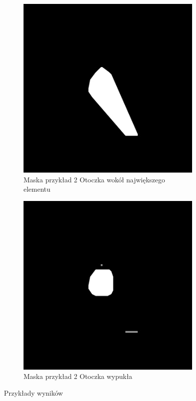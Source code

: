 \documentclass[a4paper,11pt,twoside]{report}
\theoremstyle{definition}
\begin{document}
\begin{figure}[htb]
	\medskip
	\begin{subfigure}{0.25\textwidth}
		\includegraphics[width=\linewidth]{Mask/2/biggest.png}
		\caption{Maska przykład 2 Otoczka wokół największego elementu}
		\label{fig:3}
	\end{subfigure}\hfil %
	\begin{subfigure}{0.25\textwidth}
		\includegraphics[width=\linewidth]{Mask/2/hull.png}
		\caption{Maska przykład 2 Otoczka wypukła}
		\label{fig:4}
	\end{subfigure}\hfil %
	
	\caption{Przykłady wyników}
	\label{fig:images}
\end{figure}
\end{document}
